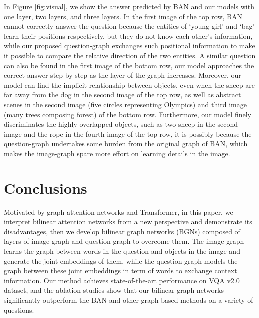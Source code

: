 \documentclass[10pt,twocolumn,letterpaper]{article}
\begin{document}
In Figure \ref{fig:visual}, we show the answer predicted by BAN and our models with one layer, two layers, and three layers. In the first image of the top row, BAN cannot correctly answer the question because the entities of `young girl' and `bag' learn their positions respectively, but they do not know each other's information, while our proposed question-graph exchanges such positional information to make it possible to compare the relative direction of the two entities. A similar question can also be found in the first image of the bottom row, our model approaches the correct answer step by step as the layer of the graph increases. Moreover, our model can find the implicit relationship between objects, even when the sheep are far away from the dog in the second image of the top row, as well as abstract scenes in the second image (five circles representing Olympics) and third image (many trees composing forest) of the bottom row. Furthermore, our model finely discriminates the highly overlapped objects, such as two sheep in the second image and the rope in the fourth image of the top row, it is possibly because the question-graph undertakes some burden from the original graph of BAN, which makes the image-graph spare more effort on learning details in the image. 

\section{Conclusions}
Motivated by graph attention networks and Transformer, in this paper, we interpret bilinear attention networks from a new perspective and demonstrate its disadvantages, then we develop bilinear graph networks (BGNs) composed of layers of image-graph and question-graph to overcome them. The image-graph learns the graph between words in the question and objects in the image and generate the joint embeddings of them, while the question-graph models the graph between these joint embeddings in term of words to exchange context information. Our method achieves state-of-the-art performance on VQA v2.0 dataset, and the ablation studies show that our bilinear graph networks significantly outperform the BAN and other graph-based methods on a variety of questions.

{\small
	
	
}
\end{document}
